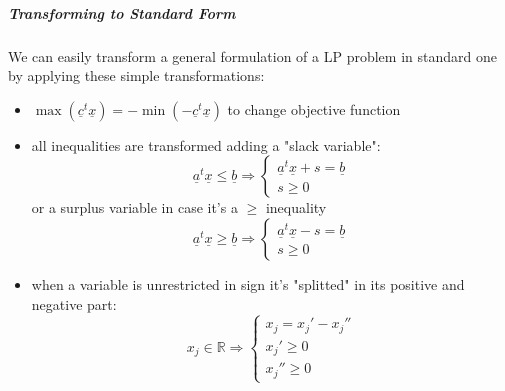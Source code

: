             \subparagraph{Transforming to Standard Form}
                We can easily transform a general formulation of a LP problem in standard one by applying these simple transformations:
                \begin{itemize}
                    \item $\max(\underline{c}^t\underline{x}) = -\min(-\underline{c}^t\underline{x})$ to change objective function
                    \item all inequalities are transformed adding a "slack variable":
                        \begin{equation}
                            \underline{a}^t\underline{x} \leq \underline{b} \Rightarrow
                                \begin{cases}
                                    \underline{a}^t\underline{x} + s = \underline{b}\\
                                    s \geq 0
                                \end{cases}
                        \end{equation}
                        or a surplus variable in case it's a $\geq$ inequality
                        \begin{equation}
                            \underline{a}^t\underline{x} \geq \underline{b} \Rightarrow
                                \begin{cases}
                                    \underline{a}^t\underline{x} - s = \underline{b}\\
                                    s \geq 0
                                \end{cases}
                        \end{equation}
                    \item when a variable is unrestricted in sign it's "splitted" in its positive and negative part:
                        \begin{equation}
                            x_j \in \mathbb{R} \Rightarrow
                                \begin{cases}
                                        x_j = x_j'-x_j''\\
                                        x_j' \geq 0\\
                                        x_j'' \geq 0
                                \end{cases}
                        \end{equation}
                \end{itemize}

